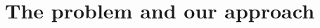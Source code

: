 \documentclass[acmsmall,review,anonymous,screen]{acmart}\settopmatter{printfolios=true,printacmref=false}
\begin{document}
\section{The problem and our approach}
\label{s:outline}  
% 
%
%
%   
%
%
%
% 
%
%
%
%
% 
% 
% 
%
%
%
%
% 
%
%
%
%
%
\end{document}
